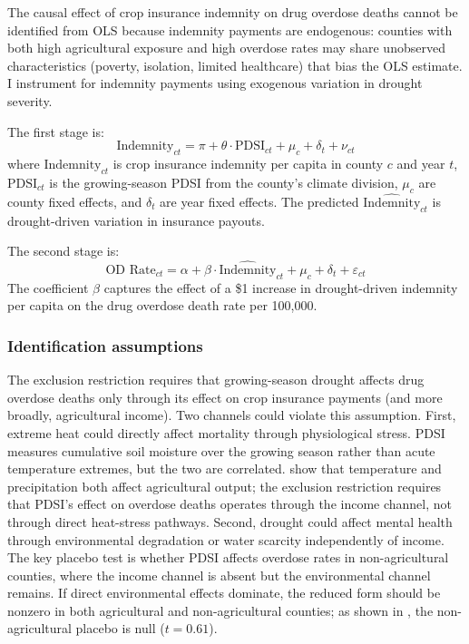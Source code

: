 \documentclass[12pt]{article}
\begin{document}
The causal effect of crop insurance indemnity on drug overdose deaths cannot be identified from OLS because indemnity payments are endogenous: counties with both high agricultural exposure and high overdose rates may share unobserved characteristics (poverty, isolation, limited healthcare) that bias the OLS estimate. I instrument for indemnity payments using exogenous variation in drought severity.

The first stage is:
\begin{equation}
\text{Indemnity}_{ct} = \pi + \theta \cdot \text{PDSI}_{ct} + \mu_c + \delta_t + \nu_{ct}
\label{eq:first_stage}
\end{equation}
where $\text{Indemnity}_{ct}$ is crop insurance indemnity per capita in county $c$ and year $t$, $\text{PDSI}_{ct}$ is the growing-season PDSI from the county's climate division, $\mu_c$ are county fixed effects, and $\delta_t$ are year fixed effects. The predicted $\widehat{\text{Indemnity}}_{ct}$ is drought-driven variation in insurance payouts.

The second stage is:
\begin{equation}
\text{OD Rate}_{ct} = \alpha + \beta \cdot \widehat{\text{Indemnity}}_{ct} + \mu_c + \delta_t + \varepsilon_{ct}
\label{eq:second_stage}
\end{equation}
The coefficient $\beta$ captures the effect of a \$1 increase in drought-driven indemnity per capita on the drug overdose death rate per 100,000.

\subsubsection*{Identification assumptions} The exclusion restriction requires that growing-season drought affects drug overdose deaths only through its effect on crop insurance payments (and more broadly, agricultural income). Two channels could violate this assumption. First, extreme heat could directly affect mortality through physiological stress. PDSI measures cumulative soil moisture over the growing season rather than acute temperature extremes, but the two are correlated. \citet{deschenes2007economic} show that temperature and precipitation both affect agricultural output; the exclusion restriction requires that PDSI's effect on overdose deaths operates through the income channel, not through direct heat-stress pathways. Second, drought could affect mental health through environmental degradation or water scarcity independently of income. The key placebo test is whether PDSI affects overdose rates in non-agricultural counties, where the income channel is absent but the environmental channel remains. If direct environmental effects dominate, the reduced form should be nonzero in both agricultural and non-agricultural counties; as shown in , the non-agricultural placebo is null ($t = 0.61$).
\end{document}
